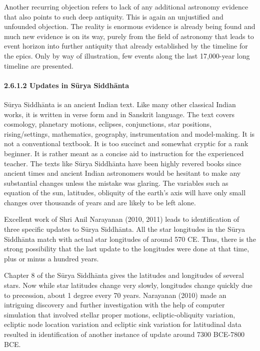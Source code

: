 Another recurring objection refers to lack of any additional astronomy evidence that also points to such deep antiquity. This is again an unjustified and unfounded objection. The reality is enormous evidence is already being found and much new evidence is on its way, purely from the field of astronomy that leads to event horizon into further antiquity that already established by the timeline for the epics. Only by way of illustration, few events along the last 17,000-year long timeline are presented.


\paragraph*{2.6.1.2 Updates in Sūrya Siddhānta}

Sūrya Siddhānta is an ancient Indian text. Like many other classical Indian works, it is written in verse form and in Sanskrit language. The text covers cosmology, planetary motions, eclipses, conjunctions, star positions, rising/settings, mathematics, geography, instrumentation and model-making. It is not a conventional textbook. It is too succinct and somewhat cryptic for a rank beginner. It is rather meant as a concise aid to instruction for the experienced teacher. The texts like Sūrya Siddhānta have been highly revered books since ancient times and ancient Indian astronomers would be hesitant to make any substantial changes unless the mistake was glaring. The variables such as equation of the sun, latitudes, obliquity of the earth's axis will have only small changes over thousands of years and are likely to be left alone.

\vskip 3pt

Excellent work of Shri Anil Narayanan (2010, 2011) leads to identification of three specific updates to Sūrya Siddhānta. All the star longitudes in the Sūrya Siddhānta match with actual star longitudes of around 570 CE. Thus, there is the strong possibility that the last update to the longitudes were done at that time, plus or minus a hundred years.

\vskip 3pt

Chapter 8 of the Sūrya Siddhānta gives the latitudes and longitudes of several stars. Now while star latitudes change very slowly, longitudes change quickly due to precession, about 1 degree every 70 years. Narayanan (2010) made an intriguing discovery and further investigation with the help of computer simulation that involved stellar proper motions, ecliptic-obliquity variation, ecliptic node location variation and ecliptic sink variation for latitudinal data resulted in identification of another instance of update around 7300 BCE-7800 BCE.

